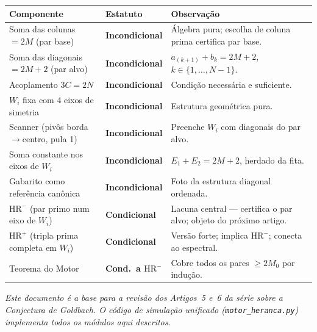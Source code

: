 \documentclass[12pt,a4paper]{article}
\theoremstyle{definition}
\newcommand{\HRm}{\mathrm{HR}^{-}}
\newcommand{\HRp}{\mathrm{HR}^{+}}
\begin{document}
\renewcommand{\arraystretch}{1.5}
\begin{center}
\begin{tabular}{p{5.8cm} >{\bfseries}p{2.8cm} p{4.8cm}}
	\toprule
	\textbf{Componente} & \textbf{Estatuto} & \textbf{Observação} \\
	\midrule
	Soma das colunas $= 2M$ (par base) &
		Incondicional &
		Álgebra pura; escolha de coluna prima certifica par base. \\
	Soma das diagonais $= 2M{+}2$ (par alvo) &
		Incondicional &
		$a_{(k+1)} + b_k = 2M{+}2$, $k \in \{1,\ldots,N{-}1\}$. \\
	Acoplamento $3C = 2N$ &
		Incondicional &
		Condição necessária e suficiente. \\
	$W_i$ fixa com 4 eixos de simetria &
		Incondicional &
		Estrutura geométrica pura. \\
	Scanner (pivôs borda$\to$centro, pula 1) &
		Incondicional &
		Preenche $W_i$ com diagonais do par alvo. \\
	Soma constante nos eixos de $W_i$ &
		Incondicional &
		$E_1 + E_2 = 2M{+}2$, herdado da fita. \\
	Gabarito como referência canônica &
		Incondicional &
		Foto da estrutura diagonal ordenada. \\
	$\HRm$ (par primo num eixo de $W_i$) &
		Condicional &
		Lacuna central — certifica o par alvo; objeto do próximo artigo. \\
	$\HRp$ (tripla prima completa em $W_i$) &
		Condicional &
		Versão forte; implica $\HRm$; conecta ao espectral. \\
	Teorema do Motor &
		Cond.\ a $\HRm$ &
		Cobre todos os pares $\geq 2M_0$ por indução. \\
	\bottomrule
\end{tabular}
\end{center}

\bigskip
\noindent\textit{Este documento é a base para a revisão dos Artigos~5 e~6
da série sobre a Conjectura de Goldbach. O código de simulação unificado
(\texttt{motor\_heranca.py}) implementa todos os módulos aqui descritos.}
\end{document}
